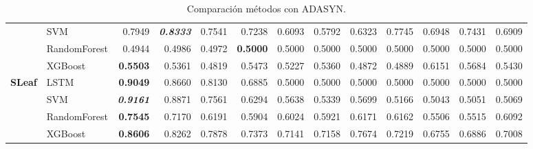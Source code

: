 \begin{table}[H]
\begin{adjustbox}{max width=14cm}
\begin{tabular}{|c|l|r|r|r|r|r|r|r|r|r|r|r|}
			                      & SVM          & 0.7949                   & \textit{\textbf{0.8333}} & 0.7541          & 0.7238                   & 0.6093          & 0.5792 & 0.6323          & 0.7745                   & 0.6948                   & 0.7431          & 0.6909          \\
			                      & RandomForest & 0.4944                   & 0.4986                   & 0.4972          & \textbf{0.5000}          & 0.5000          & 0.5000 & 0.5000          & 0.5000                   & 0.5000                   & 0.5000          & 0.5000          \\
			                      & XGBoost      & \textbf{0.5503}          & 0.5361                   & 0.4819          & 0.5473                   & 0.5227          & 0.5360 & 0.4872          & 0.4889                   & 0.6151                   & 0.5684          & 0.5430          \\
			\hline
			\textbf{SLeaf}        & LSTM         & \textbf{0.9049}          & 0.8660                   & 0.8130          & 0.6885                   & 0.5000          & 0.5000 & 0.5000          & 0.5000                   & 0.5000                   & 0.5000          & 0.5000          \\
			                      & SVM          & \textit{\textbf{0.9161}} & 0.8871                   & 0.7561          & 0.6294                   & 0.5638          & 0.5339 & 0.5699          & 0.5166                   & 0.5043                   & 0.5051          & 0.5069          \\
			                      & RandomForest & \textbf{0.7545}          & 0.7170                   & 0.6191          & 0.5904                   & 0.6024          & 0.5921 & 0.6171          & 0.6162                   & 0.5506                   & 0.5515          & 0.6092          \\
			                      & XGBoost      & \textbf{0.8606}          & 0.8262                   & 0.7878          & 0.7373                   & 0.7141          & 0.7158 & 0.7674          & 0.7219                   & 0.6755                   & 0.6886          & 0.7008          \\
			\hline
		\end{tabular}
	\end{adjustbox}
	\caption{Comparación métodos con ADASYN.}
	\label{tab:all_comp_adasyn}
\end{table}

